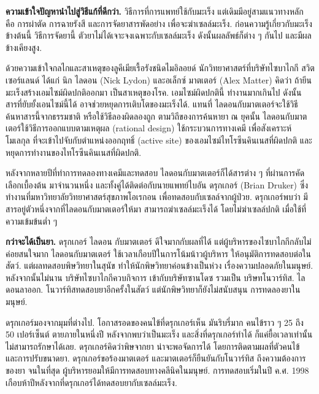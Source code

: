 {\begin{shaded}
	\textbf{ความเข้าใจปัญหานำไปสู่วิธีแก้ที่ดีกว่า.}
	วิธีการที่การแพทย์ใช้กับมะเร็ง แต่เดิมมีอยู่สามแนวทางหลัก คือ
	การผ่าตัด การฉายรังสี และการจัดยาสารพัดอย่าง เพื่อจะฆ่าเซลล์มะเร็ง.
	ก่อนความรู้เกี่ยวกับมะเร็งข้างต้นนี้
	วิธีการจัดยานี้ ตัวยาไม่ได้เจาะจงเฉพาะกับเซลล์มะเร็ง ดังนั้นผลลัพธ์ก็ต่าง ๆ กันไป และมีผลข้างเคียงสูง.
	
	ด้วยความเข้าใจกลไกและสาเหตุของลูคีเมียเรื้อรังชนิดไมอิลอยด์ 
	นักวิทยาศาสตร์ที่บริษัทไซบาไกกี สวิตเซอร์แลนด์ ได้แก่
	นิก ไลดอน (Nick Lydon) และอเล็กซ์ มาตเตอร์ (Alex Matter) 
	คิดว่า ถ้ายีนมะเร็งสร้างเอมไซม์ผิดปกติออกมา เป็นสาเหตุของโรค.
	เอมไซม์ผิดปกตินี้ ทำงานมากเกินไป 
	ดังนั้น
	สารที่ยับยั้งเอนไซม์นี้ได้ อาจช่วยหยุดการเติบโตของมะเร็งได้.
	แทนที่ ไลดอนกับมาตเตอร์จะใช้วิธีค้นหาสารนี้จากธรรมชาติ หรือใช้วิธีลองผิดลองถูก ตามวิถีของการค้นหายา ณ ยุคนั้น
	ไลดอนกับมาตเตอร์ใช้วิธีการออกแบบตามเหตุผล (rational design)
	ใช้กระบวนการทางเคมี เพื่อสังเคราะห์โมเลกุล 
	ที่จะเข้าไปจับกับตำแหน่งออกฤทธิ์ (active site) ของเอมไซม์ไทโรซีนคินเนสที่ผิดปกติ   และหยุดการทำงานของไทโรซีนคินเนสที่ผิดปกติ.

	หลังจากหลายปีที่ทำการทดลองทางเคมีและทดสอบ ไลดอนกับมาตเตอร์ก็ได้สารต่าง ๆ ที่ผ่านการคัดเลือกเบื้องต้น มาจำนวนหนึ่ง
	และทั้งคู่ได้ติดต่อกับนายแพทย์ไบอัน ดรุกเกอร์ (Brian Druker) ซึ่งทำงานที่มหาวิทยาลัยวิทยาศาสตร์สุขภาพโอเรกอน เพื่อทดสอบกับเซลล์จากผู้ป่วย.
	ดรุกเกอร์พบว่า มีสารอยู่ตัวหนึ่งจากที่ไลดอนกับมาตเตอร์ให้มา สามารถฆ่าเซลล์มะเร็งได้ โดยไม่ฆ่าเซลล์ปกติ เมื่อใช้ที่ความเข้มข้นต่ำ ๆ
	
	\textbf{กว่าจะได้เป็นยา.}
	ดรุกเกอร์ ไลดอน กับมาตเตอร์ ดีใจมากกับผลที่ได้ แต่ผู้บริหารของไซบาไกกีกลับไม่ค่อยสนใจมาก
	ไลดอนกับมาตเตอร์ ใช้เวลาเกือบปีในการโน้มน้าวผู้บริหาร ให้อนุมัติการทดสอบต่อในสัตว์.
	แต่ผลทดสอบพิษวิทยาในสุนัข ทำให้นักพิษวิทยาค่อนข้างเป็นห่วง
	เรื่องความปลอดภัยในมนุษย์.
	หลังจากนั้นไม่นาน บริษัทไซบาไกกีควบกิจการ เข้ากับบริษัทซานโดซ
	รวมเป็น บริษทโนวาร์ทิส.
	ไลดอนลาออก.
	โนวาร์ทิสทดสอบยาอีกครั้งในสัตว์ แต่นักพิษวิทยาก็ยังไม่สนับสนุน
	การทดลองยาในมนุษย์.
	
	ดรุกเกอร์มองจากมุมที่ต่างไป. โอกาสรอดของคนไข้ที่ดรุกเกอร์เห็น มันริบรี่มาก คนไข้ราว ๆ 25 ถึง 50 เปอร์เซ็นต์ ตายภายในหนึ่งปี หลังจากพบว่าเป็นมะเร็ง และสิ่งที่ดรุกเกอร์ทำได้ ก็แค่ยื้อเวลาเท่านั้น ไม่สามารถรักษาได้เลย.
	ดรุกเกอร์คิดว่าพิษจากยา น่าจะพอจัดการได้ โดยการติดตามผลที่ตัวคนไข้ และการปรับขนาดยา.
	ดรุกเกอร์ขอร้องมาตเตอร์ 
	และมาตเตอร์ก็ยืนยันกับโนวาร์ทิส ถึงความต้องการของยา 
	จนในที่สุด ผู้บริหารยอมให้มีการทดสอบทางคลีนิคในมนุษย์.
	การทดสอบเริ่มในปี ค.ศ. 1998 เกือบห้าปีหลังจากที่ดรุกเกอร์ได้ทดสอบยากับเซลล์มะเร็ง.
	

\end{shaded}}
